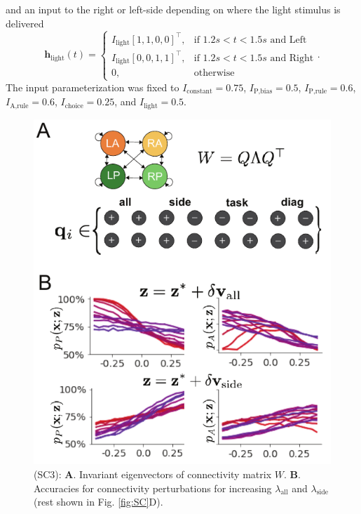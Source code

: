 \documentclass[11pt]{article}
\begin{document}
and an input to the right or left-side depending on where the light stimulus is delivered    
\begin{equation}  \mathbf{h}_{\text{light}}(t) = \begin{cases}
                           I_{\text{light}} [1, 1, 0, 0]^\top,& \text{if } 1.2s < t < 1.5s \text{ and Left} \\
                           I_{\text{light}} [0, 0, 1, 1]^\top,& \text{if } 1.2s < t < 1.5s \text{ and Right} \\
                            0,              & \text{otherwise}
                         \end{cases}.
\end{equation}
The input parameterization was fixed to $I_{\text{constant}} = 0.75$, $I_{\text{P,bias}} = 0.5 $, $I_{\text{P,rule}} = 0.6$,  $I_{\text{A,rule}} = 0.6$,  $I_{\text{choice}} = 0.25$,  and $I_{\text{light}} = 0.5$.


\begin{figure}
\begin{center}
\includegraphics[scale=1.1]{figures/figSC3/figSC3.pdf}
\end{center}
\caption{\small (SC3):  
\textbf{A}. Invariant eigenvectors of connectivity matrix $W$.
\textbf{B}. Accuracies for connectivity perturbations for increasing $\lambda_{\text{all}}$ and $\lambda_{\text{side}}$ (rest shown in Fig. \ref{fig:SC}D).
}
\label{fig:SC3}
\end{figure}
\end{document}
